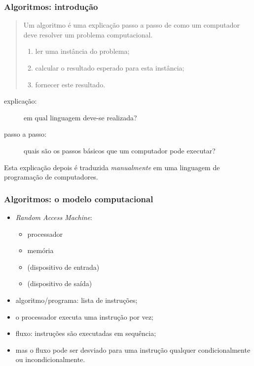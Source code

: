 \documentclass{beamer}
\begin{document}
\begin{frame}
  \frametitle{Algoritmos: introdução}

  \begin{quote}
  Um algoritmo é uma explicação passo a passo de como um computador deve
  resolver um problema computacional.
  \begin{enumerate}
  \item<1> ler uma instância do problema;
  \item<1-3> calcular o resultado esperado para esta instância;
  \item<1> fornecer este resultado.
  \end{enumerate}
  \end{quote}
  \pause
  \pause
  \begin{description}
  \item[explicação:] em qual linguagem deve-se realizada?
  \item[passo a passo:] quais são os passos básicos que um computador
    pode executar?
  \end{description}
  Esta explicação depois é traduzida \emph{manualmente} em uma linguagem
  de programação de computadores.

\end{frame}

\begin{frame}

  \frametitle{Algoritmos: o modelo computacional}

  \begin{itemize}
  \item \textit{Random Access Machine}: 
    \begin{itemize}
      \item processador
      \item memória
      \item (dispositivo de entrada)
      \item (dispositivo de saída)
    \end{itemize}
  \item algoritmo/programa: lista de instruções;
  \item o processador executa uma instrução por vez;
  \item fluxo: instruções são executadas em sequência;
  \item mas o fluxo pode ser desviado para uma instrução qualquer
    condicionalmente ou incondicionalmente.
  \end{itemize}
\end{frame}
\end{document}
